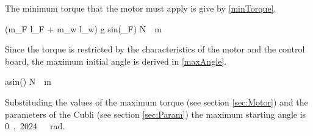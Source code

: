 \begin{enumerate}
\begin{itemize}
		The minimum torque that the motor must apply is give by \eqref{minTorque}.
		\begin{flalign}
		 { (m_F \cdot l_F + m_w \cdot l_w) \cdot g \cdot sin(\theta_F)} \unit{N\cdot m}
		\label{minTorque}
		\end{flalign}
		
		Since the torque is restricted by the characteristics of the motor and the control board, the maximum initial angle is derived in \eqref{maxAngle}.
		\begin{flalign}
		 { asin\left(\right)} \unit{N\cdot m}
		\label{maxAngle}
		\end{flalign}
		Substituding the values of the maximum torque (see section \ref{sec:Motor}) and the parameters of the Cubli (see section \ref{sec:Param}) the maximum starting angle is \si{0,2024\ rad}.

	\end{itemize}
	
\end{enumerate}